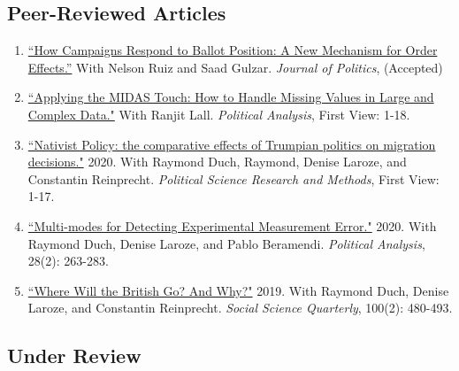\documentclass[11pt, a4paper]{article}
\begin{document}
 \subsection*{Peer-Reviewed Articles}

 \begin{enumerate}

 \item \href{https://ts-robinson.com/publication/gulzar-how-campaigns-respond-2020/gulzar-how-campaigns-respond-2020.pdf}{``How Campaigns Respond to Ballot Position: A New Mechanism for Order Effects.''} With Nelson Ruiz and Saad Gulzar. \textit{Journal of Politics}, (Accepted)

 \item \href{https://doi.org/10.1017/pan.2020.49}{``Applying the MIDAS Touch: How to Handle Missing Values in Large and Complex Data."} With Ranjit Lall. \textit{Political Analysis}, First View: 1-18.

 \item \href{https://doi.org/10.1017/psrm.2020.33}{``Nativist Policy: the comparative effects of Trumpian politics on migration decisions."} 2020. With Raymond Duch, Raymond, Denise Laroze, and Constantin Reinprecht. \textit{Political Science Research and Methods}, First View: 1-17.

 \item \href{https://www.cambridge.org/core/journals/political-analysis/article/multimodes-for-detecting-experimental-measurement-error/37514FC46CF29C7B345DB9881E252150/share/7b059037b0da9182a33316d7f87b2de81b619592}{``Multi-modes for Detecting Experimental Measurement Error."} 2020. With Raymond Duch, Denise Laroze, and Pablo Beramendi. \textit{Political Analysis}, 28(2): 263-283.

 \item \href{https://doi.org/10.1111/ssqu.12584}{``Where Will the British Go? And Why?"} 2019. With Raymond Duch, Denise Laroze, and Constantin Reinprecht. \textit{Social Science Quarterly}, 100(2): 480-493. 

\end{enumerate}


\subsection*{Under Review}
\end{document}
